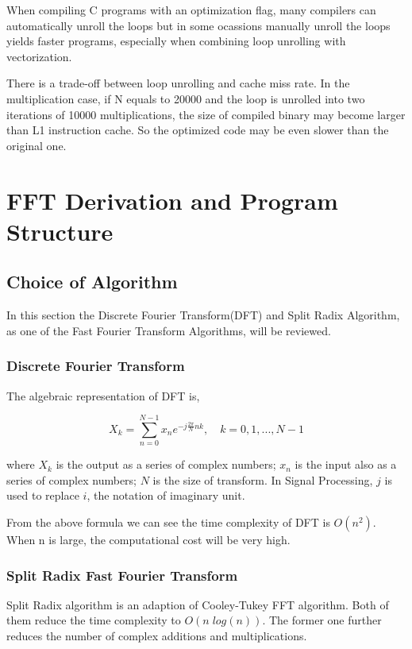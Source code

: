 \documentclass[a4paper]{report}
\begin{document}
	When compiling C programs with an optimization flag, many compilers can automatically unroll the loops but in some ocassions manually unroll the loops yields faster programs, especially when combining loop unrolling with vectorization.

	There is a trade-off between loop unrolling and cache miss rate. In the multiplication case, if N equals to 20000 and the loop is unrolled into two iterations of 10000 multiplications, the size of compiled binary may become larger than L1 instruction cache. So the optimized code may be even slower than the original one.

\chapter{FFT Derivation and Program Structure}

\section{Choice of Algorithm} \indent

	In this section the Discrete Fourier Transform(DFT) and Split Radix Algorithm, as one of the Fast Fourier Transform Algorithms, will be reviewed.

\subsection{Discrete Fourier Transform} \indent

	The algebraic representation of DFT is,
	
	\[X_k = \sum^{N-1}_{n=0} x_n e^{-j\frac{2\pi}{N}nk}, \quad k = 0, 1, ..., N-1\]
	
	where $X_k$ is the output as a series of complex numbers; $x_n$ is the input also as a series of complex numbers; $N$ is the size of transform. In Signal Processing, $j$ is used to replace $i$, the notation of imaginary unit.
	
	From the above formula we can see the time complexity of DFT is $O(n^2)$. When n is large, the computational cost will be very high.

\subsection{Split Radix Fast Fourier Transform} \indent

	Split Radix algorithm\cite{1984split} is an adaption of Cooley-Tukey FFT algorithm\cite{cooley}. Both of them reduce the time complexity to $O(n\;log(n))$. The former one further reduces the number of complex additions and multiplications.
	
\end{document}
